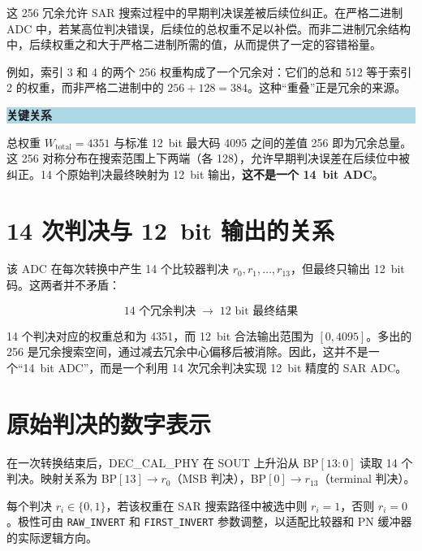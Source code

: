 \documentclass[
  UTF8,
  a4paper,
  11pt,
  oneside,
  fontset=fandol
]{ctexrep}
\newenvironment{keybox}[1]{%
  \begin{center}
  \begin{minipage}{0.94\textwidth}
  \colorbox{lightblue}{%
    \parbox{0.96\textwidth}{\textbf{#1}}}
  \vspace{0.35em}\par
}{%
  \end{minipage}
  \end{center}
}
\newcommand{\code}[1]{\texttt{#1}}
\newcommand{\Wtotal}{W_{\mathrm{total}}}
\begin{document}
这 \SI{256}{\LSB} 冗余允许 SAR 搜索过程中的早期判决误差被后续位纠正。在严格二进制 ADC 中，若某高位判决错误，后续位的总权重不足以补偿。而非二进制冗余结构中，后续权重之和大于严格二进制所需的值，从而提供了一定的容错裕量。

例如，索引 3 和 4 的两个 \SI{256}{\LSB} 权重构成了一个冗余对：它们的总和 \SI{512}{\LSB} 等于索引 2 的权重，而非严格二进制中的 $256+128=384$。这种“重叠”正是冗余的来源。

\begin{keybox}{关键关系}
总权重 $\Wtotal = 4351$ 与标准 \SI{12}{bit} 最大码 4095 之间的差值 \SI{256}{\LSB} 即为冗余总量。这 \SI{256}{\LSB} 对称分布在搜索范围上下两端（各 \SI{128}{\LSB}），允许早期判决误差在后续位中被纠正。14 个原始判决最终映射为 \SI{12}{bit} 输出，\textbf{这不是一个 \SI{14}{bit} ADC}。
\end{keybox}

\chapter{14 次判决与 \texorpdfstring{\SI{12}{bit}}{12 bit} 输出的关系}

该 ADC 在每次转换中产生 14 个比较器判决 $r_0, r_1, \ldots, r_{13}$，但最终只输出 \SI{12}{bit} 码。这两者并不矛盾：

\begin{equation}
\boxed{14 \text{ 个冗余判决} \;\longrightarrow\; 12 \text{ bit 最终结果}}
\end{equation}

14 个判决对应的权重总和为 \SI{4351}{\LSB}，而 \SI{12}{bit} 合法输出范围为 $[0, 4095]$。多出的 \SI{256}{\LSB} 是冗余搜索空间，通过减去冗余中心偏移后被消除。因此，这并不是一个“\SI{14}{bit} ADC”，而是一个利用 14 次冗余判决实现 \SI{12}{bit} 精度的 SAR ADC。

\chapter{原始判决的数字表示}

在一次转换结束后，DEC\_CAL\_PHY 在 SOUT 上升沿从 BP$[13:0]$ 读取 14 个判决。映射关系为 BP$[13] \to r_0$（MSB 判决），BP$[0] \to r_{13}$（terminal 判决）。

每个判决 $r_i \in \{0, 1\}$，若该权重在 SAR 搜索路径中被选中则 $r_i = 1$，否则 $r_i = 0$。极性可由 \code{RAW\_INVERT} 和 \code{FIRST\_INVERT} 参数调整，以适配比较器和 PN 缓冲器的实际逻辑方向。
\end{document}
